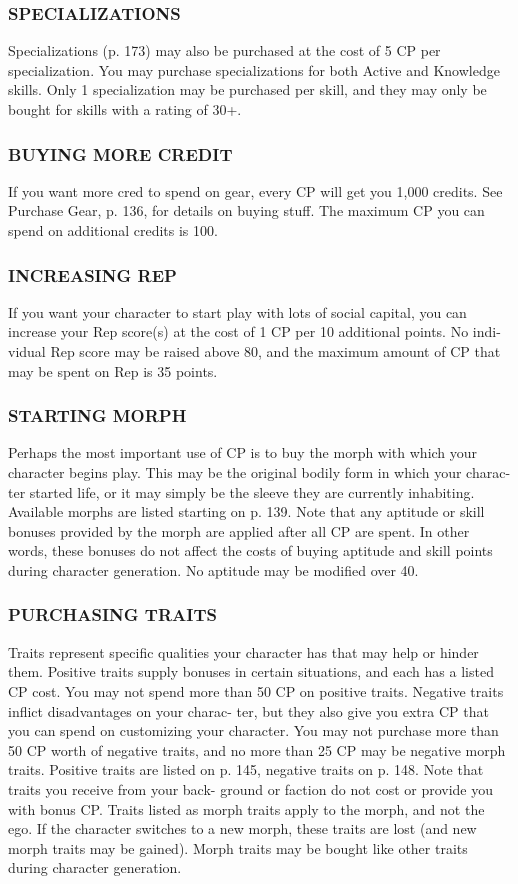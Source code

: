 \subsubsection{SPECIALIZATIONS}
Specializations (p. 173) may also be purchased at the
cost of 5 CP per specialization. You may purchase
specializations for both Active and Knowledge skills.
Only 1 specialization may be purchased per skill, and
they may only be bought for skills with a rating of
30+.

\subsubsection{BUYING MORE CREDIT}
If you want more cred to spend on gear, every CP will
get you 1,000 credits. See Purchase Gear, p. 136, for
details on buying stuff. The maximum CP you can
spend on additional credits is 100.

\subsubsection{INCREASING REP}
If you want your character to start play with lots of
social capital, you can increase your Rep score(s) at
the cost of 1 CP per 10 additional points. No indi-
vidual Rep score may be raised above 80, and the
maximum amount of CP that may be spent on Rep
is 35 points.

\subsubsection{STARTING MORPH}
Perhaps the most important use of CP is to buy the
morph with which your character begins play. This
may be the original bodily form in which your charac-
ter started life, or it may simply be the sleeve they are
currently inhabiting.
Available morphs are listed starting on p. 139.
Note that any aptitude or skill bonuses provided by
the morph are applied after all CP are spent. In other
words, these bonuses do not affect the costs of buying
aptitude and skill points during character generation.
No aptitude may be modified over 40.

\subsubsection{PURCHASING TRAITS}
Traits represent specific qualities your character has
that may help or hinder them.
Positive traits supply bonuses in certain situations,
and each has a listed CP cost. You may not spend
more than 50 CP on positive traits.
Negative traits inflict disadvantages on your charac-
ter, but they also give you extra CP that you can spend
on customizing your character. You may not purchase
more than 50 CP worth of negative traits, and no
more than 25 CP may be negative morph traits.
Positive traits are listed on p. 145, negative traits on
p. 148. Note that traits you receive from your back-
ground or faction do not cost or provide you with
bonus CP.
Traits listed as morph traits apply to the morph, and
not the ego. If the character switches to a new morph,
these traits are lost (and new morph traits may be
gained). Morph traits may be bought like other traits
during character generation.

